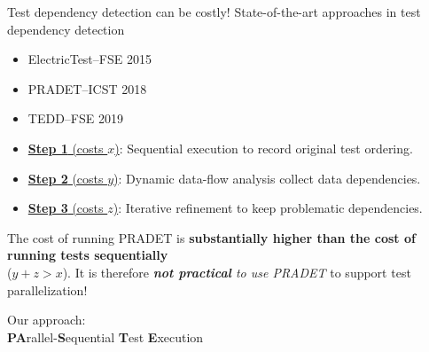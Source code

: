 \documentclass{beamer}
\begin{document}
\begin{frame}{Test dependency detection can be costly!}
State-of-the-art approaches in test dependency detection
\begin{itemize}\pause
	\item{ElectricTest--FSE 2015}
	\item{PRADET--ICST 2018}
	\item{TEDD--FSE 2019}
\end{itemize}
\begin{itemize}
	\fontsize{11}{11}\selectfont
	\item[]{\underline{\textbf{Step 1} (costs $x$)}: {\rsm Sequential execution} to record original test ordering.}\pause
	\item[]{\underline{\textbf{Step 2} (costs $y$)}: {\rsm Dynamic data-flow analysis} collect data dependencies.}\pause
	\item[]{\underline{\textbf{Step 3} (costs $z$)}: {\rsm Iterative refinement} to keep problematic dependencies.}\pause
\end{itemize}
\begin{center}
	\begin{tcolorbox}
		The cost of running {\rsm PRADET} is {\color{red} \textbf{substantially higher than the cost of running tests sequentially}}\\($y+z>{x}$). It is therefore \textit{\textbf{not practical} to use PRADET} to support test parallelization!
	\end{tcolorbox}
\end{center}
\end{frame}

\begingroup
\renewcommand{\disp}{}
\begin{frame}
	\begin{center}
		Our approach: \textbf{\tname}\\
		{\textbf{\rsm PA}rallel-\textbf{\rsm S}equential \textbf{\rsm T}est \textbf{\rsm E}xecution}
	\end{center}
\end{frame}
\endgroup
\addtocounter{framenumber}{-1}
\end{document}
